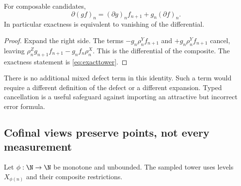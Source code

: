 \begin{proposition}\label{KS17}
For composable candidates,
\[
 \partial(gf)_n=(\partial g)_nf_{n+1}+g_n(\partial f)_n.
\]
In particular exactness is equivalent to vanishing of the differential.
\end{proposition}
\begin{proof}
Expand the right side. The terms \(-g_n\rho^Y_nf_{n+1}\) and \(+g_n\rho^Y_nf_{n+1}\) cancel, leaving \(\rho^Z_ng_{n+1}f_{n+1}-g_nf_n\rho^X_n\). This is the differential of the composite. The exactness statement is \eqref{eq:exacttower}.
\end{proof}
There is no additional mixed defect term in this identity. Such a term would require a different definition of the defect or a different expansion. Typed cancellation is a useful safeguard against importing an attractive but incorrect error formula.

\subsection{Cofinal views preserve points, not every measurement}
Let \(\phi:\N\to\N\) be monotone and unbounded. The sampled tower uses levels \(X_{\phi(n)}\) and their composite restrictions.

